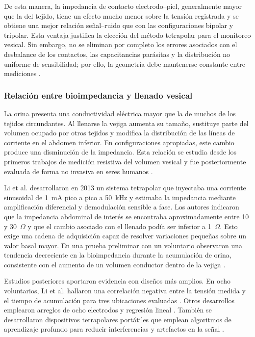 \documentclass[12pt,a4paper]{article}
\begin{document}
De esta manera, la impedancia de contacto electrodo--piel, generalmente mayor que la del tejido, tiene
un efecto mucho menor sobre la tensión registrada y se obtiene una mejor relación señal--ruido que con
las configuraciones bipolar y tripolar. Esta ventaja justifica la elección del método tetrapolar para
el monitoreo vesical. Sin embargo, no se eliminan por completo los errores asociados con el desbalance
de los contactos, las capacitancias parásitas y la distribución no uniforme de sensibilidad; por ello,
la geometría debe mantenerse constante entre mediciones
\cite{grimnes2015bioimpedance,noyori2022review}.


\subsubsection{Relación entre bioimpedancia y llenado vesical}

La orina presenta una conductividad eléctrica mayor que la de muchos de los tejidos circundantes. Al llenarse
la vejiga aumenta su tamaño, sustituye parte del volumen ocupado por otros tejidos y modifica la
distribución de las líneas de corriente en el abdomen inferior. En configuraciones apropiadas, este
cambio produce una disminución de la impedancia. Esta relación se estudia desde los
primeros trabajos de medición resistiva del volumen vesical y fue posteriormente evaluada de forma no
invasiva en seres humanos \cite{waltz1971bladder,abbey1983bladder,liao2011bladder}.

Li et al. desarrollaron en 2013 un sistema tetrapolar que inyectaba una corriente sinusoidal de
1~mA pico a pico a 50~kHz y estimaba la impedancia mediante amplificación diferencial y demodulación
sensible a fase. Los autores indicaron que la impedancia abdominal de interés se encontraba
aproximadamente entre 10 y 30~$\Omega$ y que el cambio asociado con el llenado podía ser inferior a
1~$\Omega$. Esto exige una cadena de adquisición capaz de resolver variaciones pequeñas sobre un valor
basal mayor. En una prueba preliminar con un voluntario observaron una tendencia decreciente en la bioimpedancia durante la
acumulación de orina, consistente con el aumento de un volumen conductor dentro de la vejiga
\cite{li2013monitoring}.

Estudios posteriores aportaron evidencia con diseños más amplios. En ocho voluntarios, Li et al.
hallaron una correlación negativa entre la tensión medida y el tiempo de acumulación para tres
ubicaciones evaluadas \cite{li2019electrode}. Otros desarrollos emplearon arreglos de ocho electrodos
y regresión lineal \cite{noyori2021device}. También se desarrollaron dispositivos tetrapolares
portátiles que emplean algoritmos de aprendizaje profundo para reducir interferencias y artefactos en
la señal \cite{dheman2023bladder}.
\end{document}
